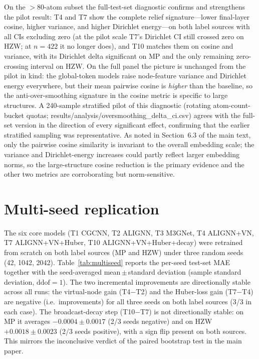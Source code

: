 \documentclass[a4paper,10pt]{article}
\begin{document}
On the \(>80\)-atom subset the full-test-set diagnostic confirms and strengthens the pilot result: T4 and T7 show the complete relief signature---lower final-layer cosine, higher variance, and higher Dirichlet energy---on both label sources with all CIs excluding zero (at the pilot scale T7's Dirichlet CI still crossed zero on HZW; at \(n=422\) it no longer does), and T10 matches them on cosine and variance, with its Dirichlet delta significant on MP and the only remaining zero-crossing interval on HZW. On the full panel the picture is unchanged from the pilot in kind: the global-token models raise node-feature variance and Dirichlet energy everywhere, but their mean pairwise cosine is \emph{higher} than the baseline, so the anti-over-smoothing signature in the cosine metric is specific to large structures. A 240-sample stratified pilot of this diagnostic (rotating atom-count-bucket quotas; \textnormal{results/analysis/oversmoothing\_delta\_ci.csv}) agrees with the full-set version in the direction of every significant effect, confirming that the earlier stratified sampling was representative. As noted in Section~6.3 of the main text, only the pairwise cosine similarity is invariant to the overall embedding scale; the variance and Dirichlet-energy increases could partly reflect larger embedding norms, so the large-structure cosine reduction is the primary evidence and the other two metrics are corroborating but norm-sensitive.

\section{Multi-seed replication}

The six core models (T1 CGCNN, T2 ALIGNN, T3 M3GNet, T4 ALIGNN+VN, T7 ALIGNN+VN+Huber, T10 ALIGNN+VN+Huber+decay) were retrained from scratch on both label sources (MP and HZW) under three random seeds (42, 1042, 2042). Table~\ref{tab:multiseed} reports the per-seed test-set MAE together with the seed-averaged mean\,\(\pm\)\,standard deviation (sample standard deviation, \(\mathrm{ddof}=1\)). The two incremental improvements are directionally stable across all runs: the virtual-node gain (T4\(-\)T2) and the Huber-loss gain (T7\(-\)T4) are negative (i.e.\ improvements) for all three seeds on both label sources (3/3 in each case). The broadcast-decay step (T10\(-\)T7) is not directionally stable: on MP it averages \(-0.0004\pm0.0017\) (2/3 seeds negative) and on HZW \(+0.0018\pm0.0023\) (2/3 seeds positive), with a sign flip present on both sources. This mirrors the inconclusive verdict of the paired bootstrap test in the main paper.
\end{document}
